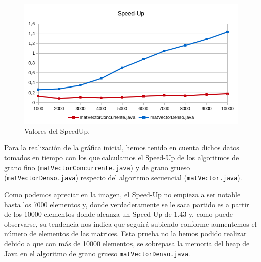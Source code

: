 \documentclass[12pt,letterpaper]{article}
\begin{document}
\begin{figure}[h]
	\begin{center}
				\includegraphics[scale=1]{SpeedUp1.png}
		\caption{Valores del SpeedUp.}
		\label{fig:Valores del SpeedUp}
	\end{center}
\end{figure}
Para la realización de la gráfica inicial, hemos tenido en cuenta dichos datos tomados en tiempo con los que calculamos el Speed-Up de los algoritmos de grano fino (\texttt{matVectorConcurrente.java}) y de grano grueso (\texttt{matVectorDenso.java}) respecto del algoritmo secuencial (\texttt{matVector.java}).

Como podemos apreciar en la imagen, el Speed-Up no empieza a ser notable hasta los 7000 elementos y, donde verdaderamente se le saca partido es a partir de los 10000 elementos donde alcanza un Speed-Up de $1.43$ y, como puede observarse, su tendencia nos indica que seguirá subiendo conforme aumentemos el número de elementos de las matrices. Esta prueba no la hemos podido realizar debido a que con más de 10000 elementos, se sobrepasa la memoria del heap de Java en el algoritmo de grano grueso \texttt{matVectorDenso.java}.

	
\end{document}
